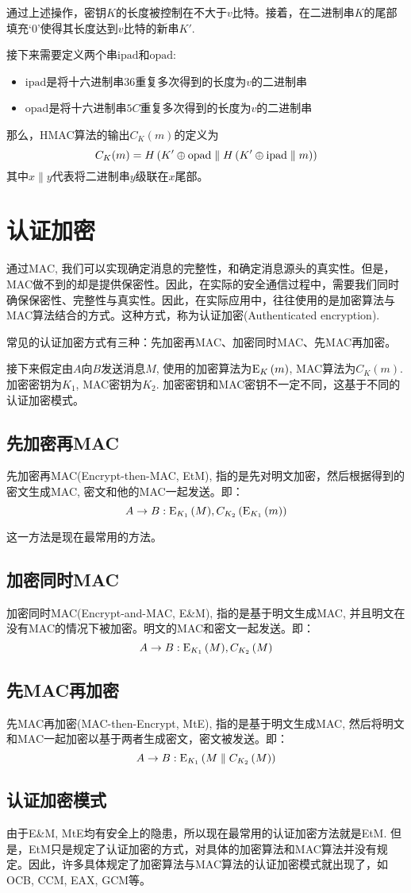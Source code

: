 通过上述操作，密钥$K$的长度被控制在不大于$v$比特。接着，在二进制串$K$的尾部填充`0'使得其长度达到$v$比特的新串$K'$.\par
接下来需要定义两个串$\mathrm{ipad}$和$\mathrm{opad}$:
\begin{itemize}
	\item $\mathrm{ipad}$是将十六进制串$36$重复多次得到的长度为$v$的二进制串
	\item $\mathrm{opad}$是将十六进制串$5C$重复多次得到的长度为$v$的二进制串
\end{itemize}

那么，HMAC算法的输出$C_K(m)$的定义为
\begin{equation}
	C_K(m)=H\left( {K'\oplus\mathrm{opad}\parallel H\left( {K'\oplus\mathrm{ipad}\parallel m}\right)}\right)
\end{equation}
其中$x\parallel y$代表将二进制串$y$级联在$x$尾部。
\section{认证加密}
通过MAC, 我们可以实现确定消息的完整性，和确定消息源头的真实性。但是，MAC做不到的却是提供保密性。因此，在实际的安全通信过程中，需要我们同时确保保密性、完整性与真实性。因此，在实际应用中，往往使用的是加密算法与MAC算法结合的方式。这种方式，称为认证加密(Authenticated encryption).\par
常见的认证加密方式有三种：先加密再MAC、加密同时MAC、先MAC再加密。\par
接下来假定由$A$向$B$发送消息$M$, 使用的加密算法为${\mathrm{E}_{K}\left({m}\right)}$, MAC算法为$C_K(m)$. 加密密钥为$K_1$, MAC密钥为$K_2$. 加密密钥和MAC密钥不一定不同，这基于不同的认证加密模式。
\subsection{先加密再MAC}
先加密再MAC(Encrypt-then-MAC, EtM), 指的是先对明文加密，然后根据得到的密文生成MAC, 密文和他的MAC一起发送。即：
\[A\to B: {\mathrm{E}_{K_1}\left({M}\right)}, C_{K_2}\left( {{\mathrm{E}_{K_1}\left({m}\right)}}\right)\]

这一方法是现在最常用的方法。
\subsection{加密同时MAC}
加密同时MAC(Encrypt-and-MAC, E\&M), 指的是基于明文生成MAC, 并且明文在没有MAC的情况下被加密。明文的MAC和密文一起发送。即：
\[A\to B:{\mathrm{E}_{K_1}\left({M}\right)}, C_{K_2}\left( {M}\right)\]
\subsection{先MAC再加密}
先MAC再加密(MAC-then-Encrypt, MtE), 指的是基于明文生成MAC, 然后将明文和MAC一起加密以基于两者生成密文，密文被发送。即：
\[A\to B:{\mathrm{E}_{K_1}\left({M\parallel C_{K_2}\left( {M}\right)}\right)}\]
\subsection{认证加密模式}
由于E\&M, MtE均有安全上的隐患，所以现在最常用的认证加密方法就是EtM. 但是，EtM只是规定了认证加密的方式，对具体的加密算法和MAC算法并没有规定。因此，许多具体规定了加密算法与MAC算法的认证加密模式就出现了，如OCB, CCM, EAX, GCM等。